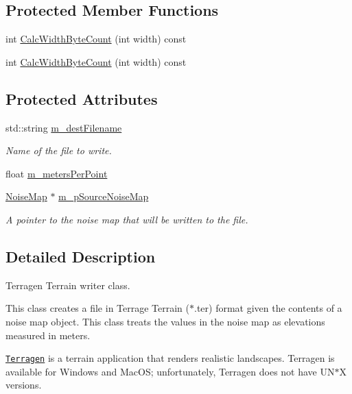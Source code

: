 \subsection*{Protected Member Functions}
\begin{DoxyCompactItemize}
\item 
int \hyperlink{classnoise_1_1utils_1_1_writer_t_e_r_ac522835cb51dd7fec31699e093c7c89c}{Calc\+Width\+Byte\+Count} (int width) const 
\item 
int \hyperlink{classnoise_1_1utils_1_1_writer_t_e_r_a0cea6c9a943b528940c4ed4f7e744cbb}{Calc\+Width\+Byte\+Count} (int width) const 
\end{DoxyCompactItemize}
\subsection*{Protected Attributes}
\begin{DoxyCompactItemize}
\item 
std\+::string \hyperlink{classnoise_1_1utils_1_1_writer_t_e_r_af272523bc008f77ad2e98f7d6b631bcc}{m\+\_\+dest\+Filename}
\begin{DoxyCompactList}\small\item\em Name of the file to write. \end{DoxyCompactList}\item 
float \hyperlink{classnoise_1_1utils_1_1_writer_t_e_r_a66dd93d28d7157388c2e37dba5c08eff}{m\+\_\+meters\+Per\+Point}
\item 
\hyperlink{classnoise_1_1utils_1_1_noise_map}{Noise\+Map} $\ast$ \hyperlink{classnoise_1_1utils_1_1_writer_t_e_r_ace70be9bceb0ae24ccf86376e189fd97}{m\+\_\+p\+Source\+Noise\+Map}
\begin{DoxyCompactList}\small\item\em A pointer to the noise map that will be written to the file. \end{DoxyCompactList}\end{DoxyCompactItemize}


\subsection{Detailed Description}
Terragen Terrain writer class.

This class creates a file in Terrage Terrain ($\ast$.ter) format given the contents of a noise map object. This class treats the values in the noise map as elevations measured in meters.

\href{http://www.planetside.co.uk/terragen/}{\tt Terragen} is a terrain application that renders realistic landscapes. Terragen is available for Windows and Mac\+O\+S; unfortunately, Terragen does not have U\+N$\ast$\+X versions.

